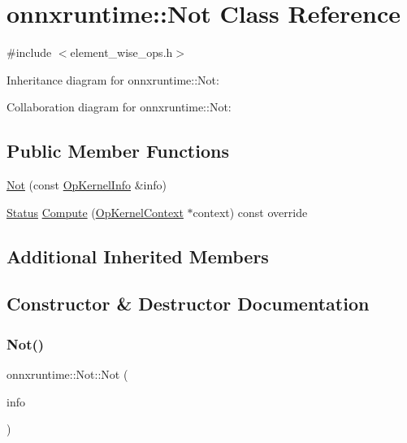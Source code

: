 \hypertarget{classonnxruntime_1_1Not}{}\section{onnxruntime\+:\+:Not Class Reference}
\label{classonnxruntime_1_1Not}


{\ttfamily \#include $<$element\+\_\+wise\+\_\+ops.\+h$>$}



Inheritance diagram for onnxruntime\+:\+:Not\+:


Collaboration diagram for onnxruntime\+:\+:Not\+:
\subsection*{Public Member Functions}
\begin{DoxyCompactItemize}
\item 
\mbox{\hyperlink{classonnxruntime_1_1Not_a91ecc8510d7b8f97f87d4bf7953233a8}{Not}} (const \mbox{\hyperlink{classonnxruntime_1_1OpKernelInfo}{Op\+Kernel\+Info}} \&info)
\item 
\mbox{\hyperlink{classonnxruntime_1_1common_1_1Status}{Status}} \mbox{\hyperlink{classonnxruntime_1_1Not_a4e471376f21219c6bae5bd1a58dda6cf}{Compute}} (\mbox{\hyperlink{classonnxruntime_1_1OpKernelContext}{Op\+Kernel\+Context}} $\ast$context) const override
\end{DoxyCompactItemize}
\subsection*{Additional Inherited Members}


\subsection{Constructor \& Destructor Documentation}
\mbox{\label{classonnxruntime_1_1Not_a91ecc8510d7b8f97f87d4bf7953233a8}} 
\subsubsection{\texorpdfstring{Not()}{Not()}}
{\footnotesize\ttfamily onnxruntime\+::\+Not\+::\+Not (\begin{DoxyParamCaption}\item[{const \mbox{\hyperlink{classonnxruntime_1_1OpKernelInfo}{Op\+Kernel\+Info}} \&}]{info }\end{DoxyParamCaption})\hspace{0.3cm}{\ttfamily [inline]}}




